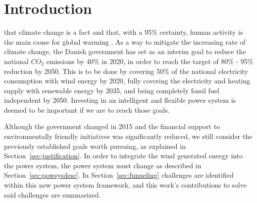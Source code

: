 \chapter{Introduction}
 that climate change is a fact and that, with a 95\% certainty, human activity is the main cause for global warming . As a way to mitigate the increasing rate of climate change, the Danish government has set as an interim goal to reduce the national $CO_2$ emissions by 40\% in 2020, in order to reach the target of 80\% - 95\% reduction by 2050. This is to be done by covering 50\% of the national electricity consumption with wind energy by 2020, fully covering the electricity and heating supply with renewable energy by 2035, and being completely fossil fuel independent by 2050. Investing in an intelligent and flexible power system is deemed to be important if we are to reach those goals.

Although the government changed in 2015 and the financial support to environmentally friendly initiatives was significantly reduced, we still consider the previously established goals worth pursuing, as explained in Section~\ref{sec:justification}. In order to integrate the wind generated energy into the power system, the power system must change as described in Section~\ref{sec:powsysdesc}. In Section~\ref{sec:funneling} challenges are identified within this new power system framework, and this work's contributions to solve said challenges are summarized.
